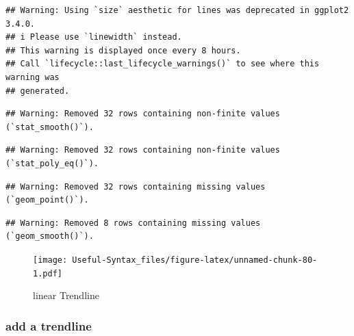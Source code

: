 \documentclass[
]{article}
\begin{document}
\begin{verbatim}
## Warning: Using `size` aesthetic for lines was deprecated in ggplot2 3.4.0.
## i Please use `linewidth` instead.
## This warning is displayed once every 8 hours.
## Call `lifecycle::last_lifecycle_warnings()` to see where this warning was
## generated.
\end{verbatim}

\begin{verbatim}
## Warning: Removed 32 rows containing non-finite values (`stat_smooth()`).
\end{verbatim}

\begin{verbatim}
## Warning: Removed 32 rows containing non-finite values (`stat_poly_eq()`).
\end{verbatim}

\begin{verbatim}
## Warning: Removed 32 rows containing missing values (`geom_point()`).
\end{verbatim}

\begin{verbatim}
## Warning: Removed 8 rows containing missing values (`geom_smooth()`).
\end{verbatim}

\begin{figure}
\centering
\texttt{[image: Useful-Syntax\_files/figure-latex/unnamed-chunk-80-1.pdf]}
\caption{\label{fig:unnamed-chunk-80}linear Trendline}
\end{figure}

\hypertarget{add-a-trendline-1}{%
\subsubsection{add a trendline}\label{add-a-trendline-1}}
\end{document}
